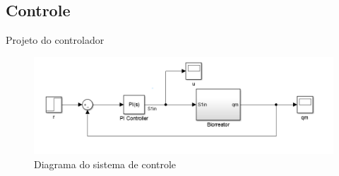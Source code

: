 \documentclass[10pt]{beamer}
\begin{document}

\subsection{Controle}
\begin{frame}[fragile]{Projeto do controlador}
\begin{center}
\begin{figure}
\includegraphics[width=1\textwidth]{figures/malha.png}
\caption{Diagrama do sistema de controle}
\end{figure}
\end{center}
\end{frame}
\end{document}
